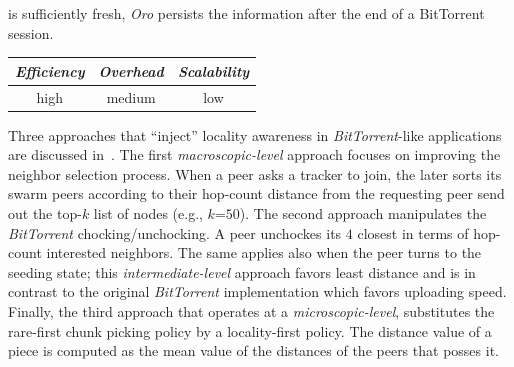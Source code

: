is sufficiently fresh, 
\emph{Oro} persists the information 
after the end of a BitTorrent session.
\begin{center}
{\footnotesize
\begin{tabular}{ccc}
\emph{Efficiency} & \emph{Overhead} & \emph{Scalability} \\
\hline
high &
medium &
low
\end{tabular}
}
\end{center}

Three approaches that ``inject'' locality awareness 
in {\sl BitTorrent}-like applications are discussed in~\cite{LCLX2009}.
The first \emph{macroscopic-level} approach 
focuses on improving the neighbor selection process. 
When a peer asks a tracker to join, 
the later sorts its swarm peers according to
their hop-count distance from the requesting peer 
send out the top-$k$ list of nodes (e.g., $k$=$50$).
The second approach manipulates the {\sl BitTorrent} chocking/unchocking.
A peer unchockes its $4$ closest in terms of 
hop-count interested neighbors. 
The same applies also when the peer turns to 
the seeding state;  this  \emph{intermediate-level} approach favors
least distance and is in contrast to the original {\sl BitTorrent} 
implementation which favors uploading speed.
Finally, the third approach that operates at 
a \emph{microscopic-level}, substitutes the rare-first chunk picking
policy by a locality-first policy. 
The distance value of a piece is computed as the mean value 
of the distances of the peers that posses it. 
